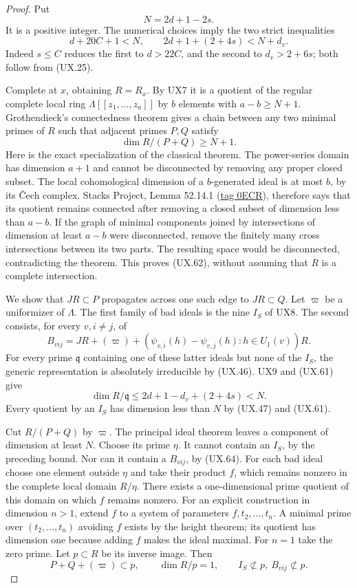 \begin{proof}
Put
\[
                    N=2d+1-2s .
 \tag{UX.60}
\]
It is a positive integer.  The numerical
choices imply the two strict inequalities
\[
 d+20C+1<N,\qquad
 2d+1+(2+4s)<N+d_v .
 \tag{UX.61}
\]
Indeed $s\le C$ reduces the first to
$d>22C$, and the second to $d_v>2+6s$;
both follow from (UX.25).

Complete at $x$, obtaining $R=R_x$.
By UX7 it is a quotient of the regular
complete local ring
$\Lambda[[z_1,\ldots,z_a]]$ by $b$
elements with $a-b\ge N+1$.
Grothendieck's connectedness theorem gives
a chain between any two minimal primes
of $R$ such that adjacent primes $P,Q$
satisfy
\[
                       \dim R/(P+Q)\ge N+1 .
 \tag{UX.62}
\]
Here is the exact specialization of the
classical theorem.  The power-series
domain has dimension $a+1$ and cannot
be disconnected by removing any proper
closed subset.  The local cohomological
dimension of a $b$-generated ideal is
at most $b$, by its \v Cech complex.
Stacks Project, Lemma 52.14.1
(\href{https://stacks.math.columbia.edu/tag/0ECR}{tag 0ECR}),
therefore says that its quotient remains
connected after removing a closed subset
of dimension less than $a-b$.
If the graph of minimal components
joined by intersections of dimension
at least $a-b$ were disconnected,
remove the finitely many cross
intersections between its two parts.
The resulting space would be disconnected,
contradicting the theorem.  This proves
(UX.62), without assuming that $R$
is a complete intersection.

We show that $JR\subset P$ propagates
across one such edge to $JR\subset Q$.
Let $\varpi$ be a uniformizer of
$\Lambda$.  The first family of bad
ideals is the nine $I_S$ of UX8.
The second consists, for every $v,i\ne j$,
of
\[
 B_{vij}=JR+(\varpi)+
     (\psi_{v,i}(h)-\psi_{v,j}(h):
                                      h\in U_1(v))R .
 \tag{UX.63}
\]
For every prime $\mathfrak q$ containing
one of these latter ideals but none of
the $I_S$, the generic representation
is absolutely irreducible by (UX.46).
UX9 and (UX.61) give
\[
        \dim R/\mathfrak q
        \le2d+1-d_v+(2+4s)<N .
 \tag{UX.64}
\]
Every quotient by an $I_S$ has
dimension less than $N$ by (UX.47)
and (UX.61).

Cut $R/(P+Q)$ by $\varpi$.
The principal ideal theorem leaves
a component of dimension at least $N$.
Choose its prime $\eta$.  It cannot
contain an $I_S$, by the preceding
bound.  Nor can it contain a $B_{vij}$,
by (UX.64).  For each bad ideal choose
one element outside $\eta$ and take
their product $f$, which remains
nonzero in the complete local domain
$R/\eta$.  There exists a
one-dimensional prime quotient of
this domain on which $f$ remains
nonzero.  For an explicit construction
in dimension $n>1$, extend $f$ to
a system of parameters
$f,t_2,\ldots,t_n$.  A minimal prime
over $(t_2,\ldots,t_n)$ avoiding $f$
exists by the height theorem; its
quotient has dimension one because
adding $f$ makes the ideal maximal.
For $n=1$ take the zero prime.
Let $p\subset R$ be its inverse
image.  Then
\[
 P+Q+(\varpi)\subset p,\qquad
 \dim R/p=1,\qquad
 I_S\not\subset p,\ B_{vij}\not\subset p .
 \tag{UX.65}
\]


\end{proof}
